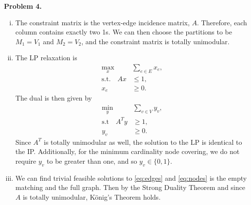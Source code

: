 \documentclass[11pt,a4paper]{article}
\begin{document}
\textbf{Problem 4.}
\begin{enumerate}[i)]
    \item The constraint matrix is the vertex-edge incidence matrix, $A$. Therefore, each column contains exactly two 1s. We can then choose the partitions to be $M_1 = V_1$ and $M_2 = V_2$, and the constraint matrix is totally unimodular.
    \item The LP relaxation is
    \begin{align}
        \nonumber \max_x & \sum_{e \in E} x_e, \\
        \text{s.t.} \quad A x &\leq 1, \label{eq:edges} \\
        \nonumber x_e &\geq 0.
    \end{align}
    The dual is then given by
    \begin{align}
        \nonumber \min_y & \sum_{v \in V} y_v, \\
        \text{s.t} \quad A^T y &\geq 1, \label{eq:nodes} \\
        \nonumber y_v &\geq 0.
    \end{align}
    Since $A^T$ is totally unimodular as well, the solution to the LP is identical to the IP. Additionally, for the minimum cardinality node covering, we do not require $y_v$ to be greater than one, and so $y_v \in \{ 0, 1 \}$.
    \item We can find trivial feasible solutions to \eqref{eq:edges} and \eqref{eq:nodes} is the empty matching and the full graph. Then by the Strong Duality Theorem and since $A$ is totally unimodular, K\"{o}nig's Theorem holds.
\end{enumerate}
\end{document}
